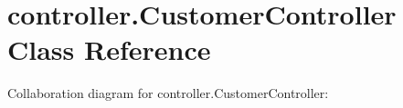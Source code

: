 \hypertarget{classcontroller_1_1_customer_controller}{}\section{controller.\+Customer\+Controller Class Reference}
\label{classcontroller_1_1_customer_controller}


Collaboration diagram for controller.\+Customer\+Controller\+:
